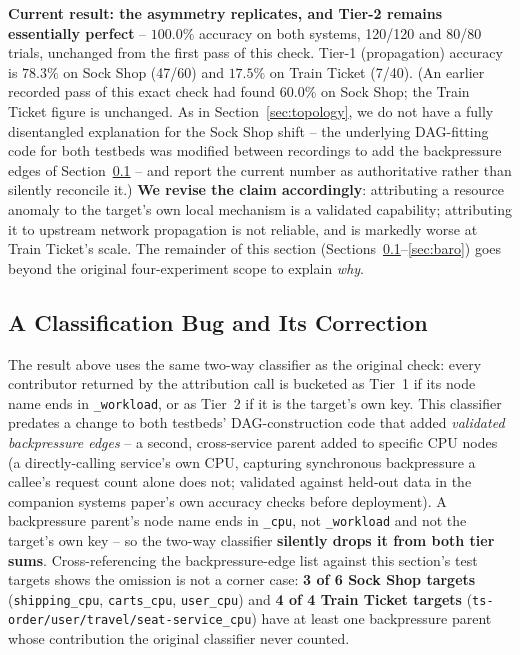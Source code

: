 \documentclass[journal, 10pt]{IEEEtran}
\begin{document}
\textbf{Current result: the asymmetry replicates, and Tier-2 remains essentially perfect} -- $100.0\%$ accuracy on both systems, 120/120 and 80/80 trials, unchanged from the first pass of this check. Tier-1 (propagation) accuracy is $78.3\%$ on Sock Shop (47/60) and $17.5\%$ on Train Ticket (7/40). (An earlier recorded pass of this exact check had found $60.0\%$ on Sock Shop; the Train Ticket figure is unchanged. As in Section~\ref{sec:topology}, we do not have a fully disentangled explanation for the Sock Shop shift -- the underlying DAG-fitting code for both testbeds was modified between recordings to add the backpressure edges of Section~\ref{sec:tier-v2} -- and report the current number as authoritative rather than silently reconcile it.) \textbf{We revise the claim accordingly}: attributing a resource anomaly to the target's own local mechanism is a validated capability; attributing it to upstream network propagation is not reliable, and is markedly worse at Train Ticket's scale. The remainder of this section (Sections~\ref{sec:tier-v2}--\ref{sec:baro}) goes beyond the original four-experiment scope to explain \emph{why}.

\subsection{A Classification Bug and Its Correction}
\label{sec:tier-v2}
The result above uses the same two-way classifier as the original check: every contributor returned by the attribution call is bucketed as Tier~1 if its node name ends in \texttt{\_workload}, or as Tier~2 if it is the target's own key. This classifier predates a change to both testbeds' DAG-construction code that added \emph{validated backpressure edges} -- a second, cross-service parent added to specific CPU nodes (a directly-calling service's own CPU, capturing synchronous backpressure a callee's request count alone does not; validated against held-out data in the companion systems paper's own accuracy checks before deployment). A backpressure parent's node name ends in \texttt{\_cpu}, not \texttt{\_workload} and not the target's own key -- so the two-way classifier \textbf{silently drops it from both tier sums}. Cross-referencing the backpressure-edge list against this section's test targets shows the omission is not a corner case: \textbf{3 of 6 Sock Shop targets} (\texttt{shipping\_cpu}, \texttt{carts\_cpu}, \texttt{user\_cpu}) and \textbf{4 of 4 Train Ticket targets} (\texttt{ts-order/user/travel/seat-service\_cpu}) have at least one backpressure parent whose contribution the original classifier never counted.
\end{document}
